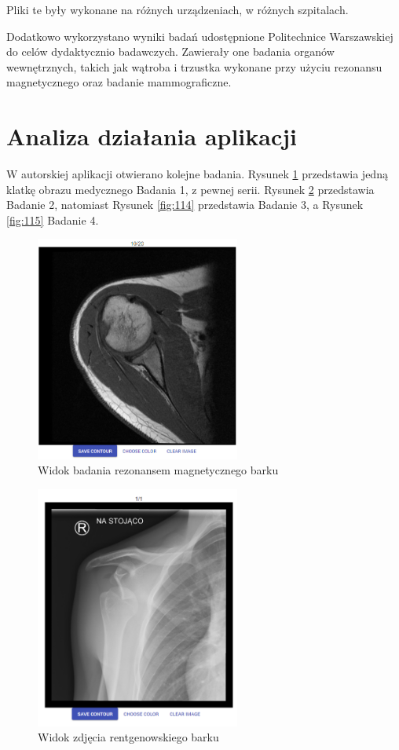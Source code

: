 \documentclass[a4paper,11pt,twoside,openright]{report}
\theoremstyle{definition}
\begin{document}
Pliki te były wykonane na różnych urządzeniach, w różnych szpitalach.

Dodatkowo wykorzystano wyniki badań udostępnione Politechnice Warszawskiej do
celów dydaktycznio badawczych. Zawierały one badania organów wewnętrznych, takich
jak wątroba i trzustka wykonane przy użyciu rezonansu magnetycznego oraz badanie mammograficzne.

\section {Analiza działania aplikacji}

W autorskiej aplikacji otwierano kolejne badania. Rysunek \ref{fig:112} przedstawia
jedną klatkę obrazu medycznego Badania 1, z pewnej serii. Rysunek \ref{fig:113}
przedstawia Badanie 2, natomiast Rysunek \ref{fig:114} przedstawia Badanie 3, a
Rysunek \ref{fig:115} Badanie 4.

\begin{figure}[p]
	\center
	\includegraphics[width=0.6\textwidth]{112}
	\caption{Widok badania rezonansem magnetycznego barku}
    	\label{fig:112}
\end{figure}

\begin{figure}[p]
	\center
	\includegraphics[width=0.6\textwidth]{113}
	\caption{Widok zdjęcia rentgenowskiego barku}
    	\label{fig:113}
\end{figure}
\end{document}
